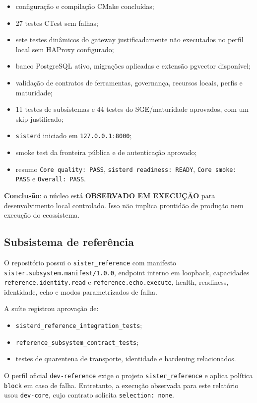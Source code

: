 \documentclass[11pt,a4paper,oneside]{article}
\newcommand{\statusobservado}{\textcolor{sistergreen}{\textbf{OBSERVADO EM EXECUÇÃO}}}
\begin{document}
\begin{itemize}
  \item configuração e compilação CMake concluídas;
  \item 27 testes CTest sem falhas;
  \item sete testes dinâmicos do gateway justificadamente não executados no perfil local sem HAProxy configurado;
  \item banco PostgreSQL ativo, migrações aplicadas e extensão pgvector disponível;
  \item validação de contratos de ferramentas, governança, recursos locais, perfis e maturidade;
  \item 11 testes de subsistemas e 44 testes do SGE/maturidade aprovados, com um skip justificado;
  \item \texttt{sisterd} iniciado em \texttt{127.0.0.1:8000};
  \item smoke test da fronteira pública e de autenticação aprovado;
  \item resumo \texttt{Core quality: PASS}, \texttt{sisterd readiness: READY}, \texttt{Core smoke: PASS} e \texttt{Overall: PASS}.
\end{itemize}

\textbf{Conclusão}: o núcleo está \statusobservado{} para desenvolvimento local controlado. Isso não implica prontidão de produção nem execução do ecossistema.

\subsection{Subsistema de referência}

O repositório possui o \texttt{sister\_reference} com manifesto \texttt{sister.subsystem.manifest/1.0.0}, endpoint interno em loopback, capacidades \texttt{reference.identity.read} e \texttt{reference.echo.execute}, health, readiness, identidade, echo e modos parametrizados de falha.

A suíte registrou aprovação de:

\begin{itemize}
  \item \texttt{sisterd\_reference\_integration\_tests};
  \item \texttt{reference\_subsystem\_contract\_tests};
  \item testes de quarentena de transporte, identidade e hardening relacionados.
\end{itemize}

O perfil oficial \texttt{dev-reference} exige o projeto \texttt{sister\_reference} e aplica política \texttt{block} em caso de falha. Entretanto, a execução observada para este relatório usou \texttt{dev-core}, cujo contrato solicita \texttt{selection: none}.
\end{document}
